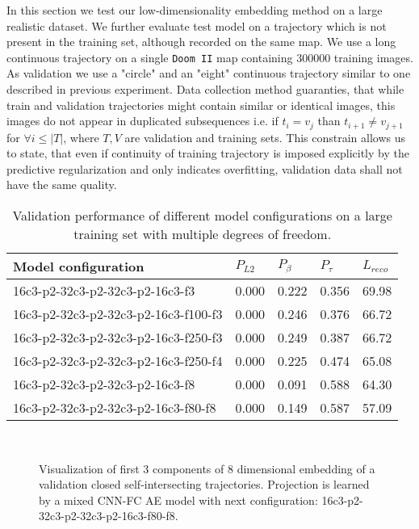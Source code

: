 In this section we test our low-dimensionality embedding method on a large realistic dataset. We further evaluate test model on a trajectory which is not present in the training set, although recorded on the same map. We use a long continuous trajectory on a single \texttt{Doom II} map containing 300000 training images.
As validation we use a "circle" and an "eight" continuous trajectory similar to one described in previous experiment.
Data collection method guaranties, that while train and validation trajectories might contain similar or identical images, this images do not appear in duplicated subsequences i.e. if $t_i = v_j$ than $t_{i+1} \neq v_{j+1}$ for $\forall i \leq |T|$, where $T, V$ are validation and training sets. This constrain allows us to state, that even if continuity of training trajectory is imposed explicitly by the predictive regularization and only indicates overfitting, validation data shall not have the same quality.

\begin{table}
\begin{center}
    \begin{tabular}{| l | l | l | l | l |}
      \hline
     Model configuration  &  $P_{L2}$ & $P_{\beta}$ & $P_{\tau}$ & $L_{reco}$ \\ \hline
     16c3-p2-32c3-p2-32c3-p2-16c3-f3     & 0.000 & 0.222 & 0.356 & 69.98 \\
     16c3-p2-32c3-p2-32c3-p2-16c3-f100-f3 & 0.000 & 0.246 & 0.376 & 66.72 \\
     16c3-p2-32c3-p2-32c3-p2-16c3-f250-f3 & 0.000 & 0.249 & 0.387 & 66.72 \\
     16c3-p2-32c3-p2-32c3-p2-16c3-f250-f4 & 0.000 & 0.225 & 0.474 & 65.08 \\
     16c3-p2-32c3-p2-32c3-p2-16c3-f8      & 0.000 & 0.091 & 0.588 & 64.30 \\
     16c3-p2-32c3-p2-32c3-p2-16c3-f80-f8  & 0.000 & 0.149 & 0.587 & 57.09 \\ \hline
     \end{tabular}
\end{center}
  \caption{Validation performance of different model configurations on a large training set with multiple degrees of freedom.}
  \label{tab:large}
\end{table}

\begin{figure}[t!]
	\centering
	\\
    	\caption{Visualization of first 3 components of 8 dimensional embedding of a validation closed self-intersecting trajectories. Projection is learned by a mixed CNN-FC AE model with next configuration: 16c3-p2-32c3-p2-32c3-p2-16c3-f80-f8.}
    	\label{fig:model_big}
\end{figure}


